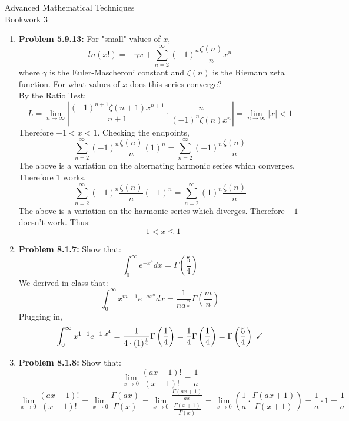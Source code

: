 \documentclass{article}
\begin{document}
\thispagestyle{fancy}
\begin{center}\LARGE{Advanced Mathematical Techniques \\ Bookwork 3}\end{center}
\vspace{10mm}
\begin{enumerate}
    \item \textbf{Problem 5.9.13:} For "small" values of $x$, 
    \[ln(x!) = -\gamma x + \sum_{n=2}^{\infty} (-1)^n \frac{\zeta(n)}{n}x^n\]
    where $\gamma$ is the Euler-Mascheroni constant and $\zeta(n)$ is the Riemann zeta function. For what values of $x$ does this series converge?
    \[\]
    By the Ratio Test:
    \[L = \lim_{n\to\infty} \left|\frac{(-1)^{n+1}\zeta(n+1)x^{n+1}}{n+1} \cdot \frac{n}{(-1)^n\zeta(n)x^n} \right| = \lim_{n \to \infty} |x| < 1\]
    Therefore $-1 < x < 1$. Checking the endpoints, 
    \[\sum_{n=2}^{\infty} (-1)^n \frac{\zeta(n)}{n}(1)^n = \sum_{n=2}^{\infty} (-1)^n \frac{\zeta(n)}{n}\]
    The above is a variation on the alternating harmonic series which converges. Therefore $1$ works.
    \[\sum_{n=2}^{\infty} (-1)^n \frac{\zeta(n)}{n}(-1)^n = \sum_{n=2}^{\infty} (1)^n \frac{\zeta(n)}{n}\]
    The above is a variation on the harmonic series which diverges. Therefore $-1$ doesn't work.
    \newline
    Thus:
    \[\boxed{-1 < x \le 1}\]\newline
    \item \textbf{Problem 8.1.7:} Show that:
    \[\int_{0}^{\infty} e^{-x^4}dx = \Gamma\left( \frac 5 4\right)\]
    \newline 
    We derived in class that: 
    \[\int_{0}^{\infty} x^{m-1} e^{-ax^n}dx = \frac{1}{na^{\frac m n}}\Gamma\left(\frac{m}{n}\right)\]
    Plugging in, 
    \[\int_{0}^{\infty} x^{1 - 1}e^{- 1 \cdot x^{4}} = \frac{1}{4\cdot (1)^{\frac 1 4}} \Gamma \left( \frac 1 4\right) = \frac{1}{4} \Gamma \left( \frac 1 4\right) = \Gamma \left( \frac 5 4 \right) \hspace{1mm} \checkmark\]
    \newline
    \item \textbf{Problem 8.1.8:} Show that:
    \[\lim_{x\to 0} \frac{(ax-1)!}{(x-1)!} = \frac 1 a\]
    \newline \newline 
    \[\lim_{x\to 0} \frac{(ax-1)!}{(x-1)!} = \lim_{x \to 0} \frac{\Gamma(ax)}{\Gamma(x)} = \lim_{x \to 0} \frac{\frac{\Gamma(ax+1)}{ax}}{\frac{\Gamma(x+1)}{\Gamma(x)}} = \lim_{x \to 0} \left( \frac 1 a \cdot \frac{\Gamma(ax+1)}{\Gamma(x+1)}\right) = \frac 1 a \cdot 1 = \boxed{\frac 1 a}\]
\end{enumerate}
\end{document}
